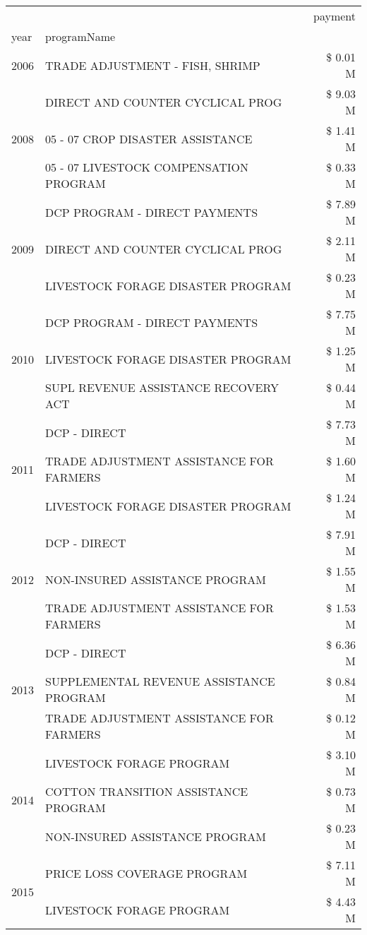\begin{tabular}{llr}
\toprule
 &  & payment \\
year & programName &  \\
\midrule
2006 & TRADE ADJUSTMENT - FISH, SHRIMP & \$ 0.01 M \\
\cline{1-3}
\multirow[t]{3}{*}{2008} & DIRECT AND COUNTER CYCLICAL PROG & \$ 9.03 M \\
 & 05 - 07 CROP DISASTER ASSISTANCE & \$ 1.41 M \\
 & 05 - 07 LIVESTOCK COMPENSATION PROGRAM & \$ 0.33 M \\
\cline{1-3}
\multirow[t]{3}{*}{2009} & DCP PROGRAM - DIRECT PAYMENTS & \$ 7.89 M \\
 & DIRECT AND COUNTER CYCLICAL PROG & \$ 2.11 M \\
 & LIVESTOCK FORAGE DISASTER  PROGRAM & \$ 0.23 M \\
\cline{1-3}
\multirow[t]{3}{*}{2010} & DCP PROGRAM - DIRECT PAYMENTS & \$ 7.75 M \\
 & LIVESTOCK FORAGE DISASTER  PROGRAM & \$ 1.25 M \\
 & SUPL REVENUE ASSISTANCE RECOVERY ACT & \$ 0.44 M \\
\cline{1-3}
\multirow[t]{3}{*}{2011} & DCP - DIRECT & \$ 7.73 M \\
 & TRADE ADJUSTMENT ASSISTANCE FOR FARMERS & \$ 1.60 M \\
 & LIVESTOCK FORAGE DISASTER PROGRAM & \$ 1.24 M \\
\cline{1-3}
\multirow[t]{3}{*}{2012} & DCP - DIRECT & \$ 7.91 M \\
 & NON-INSURED ASSISTANCE PROGRAM & \$ 1.55 M \\
 & TRADE ADJUSTMENT ASSISTANCE FOR FARMERS & \$ 1.53 M \\
\cline{1-3}
\multirow[t]{3}{*}{2013} & DCP - DIRECT & \$ 6.36 M \\
 & SUPPLEMENTAL REVENUE ASSISTANCE PROGRAM & \$ 0.84 M \\
 & TRADE ADJUSTMENT ASSISTANCE FOR FARMERS & \$ 0.12 M \\
\cline{1-3}
\multirow[t]{3}{*}{2014} & LIVESTOCK FORAGE PROGRAM & \$ 3.10 M \\
 & COTTON TRANSITION ASSISTANCE PROGRAM & \$ 0.73 M \\
 & NON-INSURED ASSISTANCE PROGRAM & \$ 0.23 M \\
\cline{1-3}
\multirow[t]{3}{*}{2015} & PRICE LOSS COVERAGE PROGRAM & \$ 7.11 M \\
 & LIVESTOCK FORAGE PROGRAM & \$ 4.43 M \\

\end{tabular}
